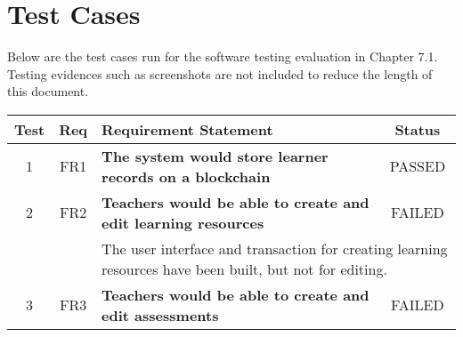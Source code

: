 
\chapter{Test Cases}

Below are the test cases run for the software testing evaluation in Chapter 7.1.
Testing evidences such as screenshots are not included to reduce the length of this document.

\begin{table}[!ht]
	\begin{tabularx}{\textwidth}{|c|c|X|c|}
		\hline
		Test                                                              & Req                     & Requirement Statement                                                                                                                                 & Status                  \\
		\hline
		1                                                                 & FR1                     & \textbf{The system would store learner records on a blockchain}                                                                                       & \cellcolor{green}PASSED \\
		\hline
		2                                                                 & FR2                     & \textbf{Teachers would be able to create and edit learning resources}                                                                                 & \cellcolor{pink}FAILED  \\
		\hline
		                                                                  &                         & \multicolumn{2}{X|}{The user interface and transaction for creating learning resources have been built,
			but not for editing.}                                                                                                                                                                                                                                                         \\
		\hline
		3                                                                 & FR3                     & \textbf{Teachers would be able to create and edit assessments}                                                                                        & \cellcolor{pink}FAILED  \\

\end{tabularx}
\end{table}

